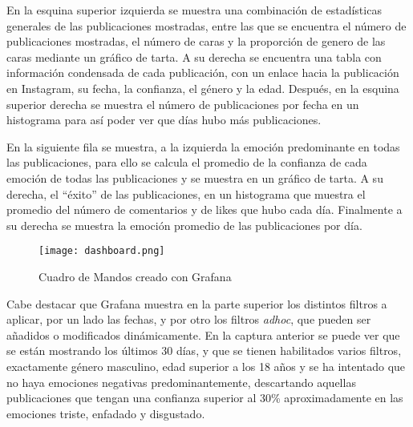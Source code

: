 En la esquina superior izquierda se muestra una combinación de estadísticas generales de las publicaciones mostradas, entre las que se encuentra el número de publicaciones mostradas, el número de caras y la proporción de genero de las caras mediante un gráfico de tarta. A su derecha se encuentra una tabla con información condensada de cada publicación, con un enlace hacia la publicación en Instagram, su fecha, la confianza, el género y la edad. Después, en la esquina superior derecha se muestra el número de publicaciones por fecha en un histograma para así poder ver que días hubo más publicaciones.

En la siguiente fila se muestra, a la izquierda la emoción predominante en todas las publicaciones, para ello se calcula el promedio de la confianza de cada emoción de todas las publicaciones y se muestra en un gráfico de tarta. A su derecha, el ``éxito'' de las publicaciones, en un histograma que muestra el promedio del número de comentarios y de likes que hubo cada día. Finalmente a su derecha se muestra la emoción promedio de las publicaciones por día.

\begin{figure}[H]
    \hspace*{-2.5cm}
    \centering
    \texttt{[image: dashboard.png]}
    \caption{Cuadro de Mandos creado con Grafana}
    \label{fig:dashboard}
\end{figure}

Cabe destacar que Grafana muestra en la parte superior los distintos filtros a aplicar, por un lado las fechas, y por otro los filtros \textit{adhoc}, que pueden ser añadidos o modificados dinámicamente. En la captura anterior se puede ver que se están mostrando los últimos 30 días, y que se tienen habilitados varios filtros, exactamente género masculino, edad superior a los 18 años y se ha intentado que no haya emociones negativas predominantemente, descartando aquellas publicaciones que tengan una confianza superior al 30\% aproximadamente en las emociones triste, enfadado y disgustado.
